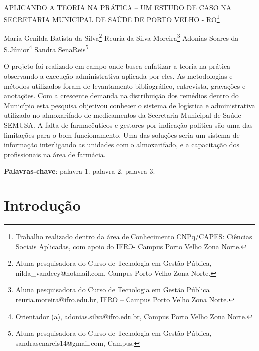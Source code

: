 \documentclass[article,12pt,onesidea,4paper,english,brazil]{abntex2}
\begin{document}
	
	
	\frenchspacing 
	
	\begin{center}
		\LARGE APLICANDO A TEORIA NA PRÁTICA – UM ESTUDO DE CASO NA SECRETARIA MUNICIPAL DE SAÚDE DE PORTO VELHO - RO\footnote{Trabalho realizado dentro da área de Conhecimento CNPq/CAPES: Ciências Sociais Aplicadas, com apoio do IFRO- Campus Porto Velho Zona Norte.}
	
	\normalsize
	Maria Genilda Batista da Silva\footnote{Aluna pesquisadora do Curso de Tecnologia em Gestão Pública, nilda\_vandecy@hotmail.com, Campus Porto Velho Zona Norte.} 
	Reuria da Silva Moreira\footnote{Aluna pesquisadora do Curso de Tecnologia em Gestão Pública reuria.moreira@ifro.edu.br, IFRO – Campus Porto Velho Zona Norte.} 
	Adonias Soares da S.Júnior\footnote{Orientador (a), adonias.silva@ifro.edu.br, Campus Porto Velho Zona Norte.} 
	Sandra SenaReis\footnote{Aluna pesquisadora do Curso de Tecnologia em Gestão Pública, sandrasenareis14@gmail.com, Campus.} 
	\end{center}
	
\begin{resumoumacoluna}
	O projeto foi realizado em campo onde busca enfatizar a teoria na prática observando a execução administrativa aplicada por eles. As metodologias e  métodos utilizados foram de levantamento bibliográfico, entrevista, gravações e anotações. Com a crescente demanda na distribuição dos remédios dentro do Município esta pesquisa objetivou conhecer o sistema de logística e administrativa utilizado no almoxarifado de medicamentos da Secretaria Municipal de Saúde- SEMUSA. A falta de farmacêuticos e gestores por indicação politica são uma das limitações para o bom funcionamento. Uma das soluções seria um sistema de informação interligando as unidades com o almoxarifado, e a capacitação dos profissionais na área de farmácia.
	
	\vspace{\onelineskip}
	
	\noindent
	\textbf{Palavras-chave}: palavra 1. palavra 2. palavra 3.
\end{resumoumacoluna}

\textual

\section*{Introdução}
\end{document}
